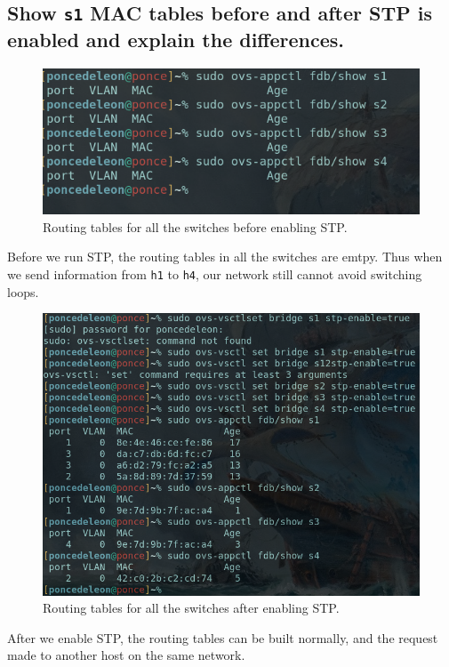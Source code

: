 \documentclass{article}
\begin{document}
\subsection{Show \texttt{s1} MAC tables before and after STP is enabled and 
explain the differences.}
\begin{figure}[h]
	\centering
	\includegraphics[scale=0.4]{NoSTPMAC.png}
	\caption{Routing tables for all the switches before enabling STP.}
\end{figure}

Before we run STP, the routing tables in all the switches are emtpy. 
Thus when we send information from \texttt{h1} to \texttt{h4}, our network still cannot
avoid switching loops.

\begin{figure}[h]
	\centering
	\includegraphics[scale=0.4]{STPMAC.png}
	\caption{Routing tables for all the switches after enabling STP.}
	\label{fig:STPRouting}
\end{figure}

After we enable STP, the routing tables can be built normally, and the request made to another
host on the same network.
\end{document}
